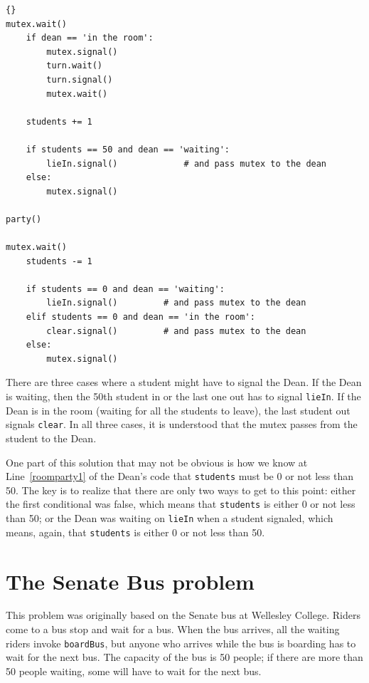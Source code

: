 \documentclass{book}
\newcommand{\clearemptydoublepage}{\newpage\cleardoublepage}
\begin{document}
\newpage
\begin{latin}
\begin{lstlisting}[title={Room party solution (student)}]{}
mutex.wait()
    if dean == 'in the room':
        mutex.signal()
        turn.wait()
        turn.signal()
        mutex.wait()

    students += 1

    if students == 50 and dean == 'waiting':
        lieIn.signal()             # and pass mutex to the dean
    else:
        mutex.signal()

party()

mutex.wait()
    students -= 1

    if students == 0 and dean == 'waiting':
        lieIn.signal()         # and pass mutex to the dean
    elif students == 0 and dean == 'in the room':
        clear.signal()         # and pass mutex to the dean
    else:
        mutex.signal()
\end{lstlisting}
\end{latin}

There are three cases where a student might have to signal the Dean.
If the Dean is waiting, then the 50th student in or the last one out
has to signal {\tt lieIn}.  If the Dean is in the room (waiting for
all the students to leave), the last student out signals {\tt clear}.
In all three cases, it is understood that the mutex passes from the
student to the Dean.

One part of this solution that may not be obvious is how we know at
Line~\ref{roomparty1} of the Dean's code that {\tt students} must be 0
or not less than 50.  The key is to realize that there are only two
ways to get to this point: either the first conditional was false,
which means that {\tt students} is either 0 or not less than 50; or
the Dean was waiting on {\tt lieIn} when a student signaled, which
means, again, that {\tt students} is either 0 or not less than 50.


\clearemptydoublepage
\section{The Senate Bus problem}

This problem was originally based on the Senate bus at Wellesley
College.  Riders come to a bus stop and wait for a bus.  When the bus
arrives, all the waiting riders invoke {\tt boardBus}, but anyone who
arrives while the bus is boarding has to wait for the next bus.  The
capacity of the bus is 50 people; if there are more than 50 people
waiting, some will have to wait for the next bus.
\end{document}
